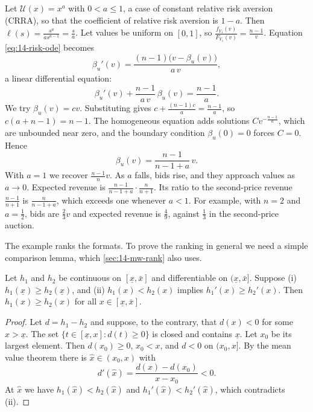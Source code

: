 \begin{example}\label{ex:14-crra}
Let $\mathcal U(x)=x^a$ with $0<a\le 1$, a case of constant relative risk aversion (CRRA), so that the coefficient of relative risk aversion is $1-a$. Then $\ell(s)=\frac{s^a}{a s^{a-1}}=\frac{s}{a}$. Let values be uniform on $[0,1]$, so $\frac{f_{Y_1}(v)}{F_{Y_1}(v)}=\frac{n-1}{v}$. Equation \eqref{eq:14-risk-ode} becomes
\[
\beta_u'(v)=\frac{(n-1)\big(v-\beta_u(v)\big)}{a\,v},
\]
a linear differential equation:
\[
\beta_u'(v)+\frac{n-1}{a\,v}\,\beta_u(v)=\frac{n-1}{a}.
\]
We try $\beta_u(v)=cv$. Substituting gives $c+\frac{(n-1)c}{a}=\frac{n-1}{a}$, so $c(a+n-1)=n-1$. The homogeneous equation adds solutions $Cv^{-\frac{n-1}{a}}$, which are unbounded near zero, and the boundary condition $\beta_u(0)=0$ forces $C=0$. Hence
\[
\beta_u(v)=\frac{n-1}{n-1+a}\,v.
\]
With $a=1$ we recover $\frac{n-1}{n}v$. As $a$ falls, bids rise, and they approach values as $a\to 0$. Expected revenue is $\frac{n-1}{n-1+a}\cdot\frac{n}{n+1}$. Its ratio to the second-price revenue $\frac{n-1}{n+1}$ is $\frac{n}{n-1+a}$, which exceeds one whenever $a<1$. For example, with $n=2$ and $a=\frac12$, bids are $\frac23v$ and expected revenue is $\frac49$, against $\frac13$ in the second-price auction.
\end{example}

The example ranks the formats. To prove the ranking in general we need a simple comparison lemma, which \cref{sec:14-mw-rank} also uses.

\begin{lemma}\label{lem:14-crossing}
Let $h_1$ and $h_2$ be continuous on $[\underline x,\bar x]$ and differentiable on $(\underline x,\bar x]$. Suppose (i) $h_1(\underline x)\ge h_2(\underline x)$, and (ii) $h_1(x)<h_2(x)$ implies $h_1'(x)\ge h_2'(x)$. Then $h_1(x)\ge h_2(x)$ for all $x\in[\underline x,\bar x]$.
\end{lemma}

\begin{proof}
Let $d=h_1-h_2$ and suppose, to the contrary, that $d(x)<0$ for some $x>\underline x$. The set $\{t\in[\underline x,x]:d(t)\ge 0\}$ is closed and contains $\underline x$. Let $x_0$ be its largest element. Then $d(x_0)\ge 0$, $x_0<x$, and $d<0$ on $(x_0,x]$. By the mean value theorem there is $\hat x\in(x_0,x)$ with
\[
d'(\hat x)=\frac{d(x)-d(x_0)}{x-x_0}<0.
\]
At $\hat x$ we have $h_1(\hat x)<h_2(\hat x)$ and $h_1'(\hat x)<h_2'(\hat x)$, which contradicts (ii).
\end{proof}

